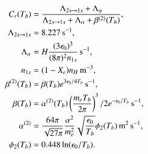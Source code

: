 \begin{subequations} \label{eq:M2:theory:peebles:ODE_all_individual_terms}
    \begin{align}
        C_r(T_b) &= \frac{\Lambda_{2s\to1s} + \Lambda_\alpha}{\Lambda_{2s\to1s} + \Lambda_\alpha + \beta^{(2)}(T_b)}, \label{eq:M2:theory:peebles:C_r} \\
        \Lambda_{2s\to1s} &= 8.227\,\mathrm{s^{-1}}, \label{eq:M2:theory:peebles:Lambda_2s_1s} \\
        \Lambda_\alpha &= H \frac{(3\epsilon_0)^3}{(8\pi)^2 n_{1s}}\,\mathrm{s^{-1}}, \label{eq:M2:theory:peebles:Lambda_alpha} \\
        n_{1s} &= (1-X_e) n_H \,\mathrm{m^{-3}}, \label{eq:M2:theory:peebles:n_1s} \\
        \beta^{(2)}(T_b) &= \beta(T_b) e^{3\epsilon_0/4T_b} \,\mathrm{s^{-1}}, \label{eq:M2:theory:peebles:beta2} \\
        \beta(T_b) &= \alpha^{(2)}(T_b) \left( \frac{m_e T_b}{2\pi} \right)^3/2 e^{-\epsilon_0/T_b} \,\mathrm{s^{-1}}, \label{eq:M2:theory:peebles:beta} \\
        \alpha^{(2)} &= \frac{64\pi}{\sqrt{27\pi}} \frac{\alpha^2}{m_e^2} \sqrt{\frac{\epsilon_0}{T_b}} \phi_2(T_b)\,\mathrm{m^2\,s^{-1}}, \label{eq:M2:theory:peebles:alpha_2} \\
        \phi_2(T_b) &= 0.448\ln(\epsilon_0/T_b). \label{eq:M2:theory:peebles:phi_2} 
    \end{align}
\end{subequations}
    



